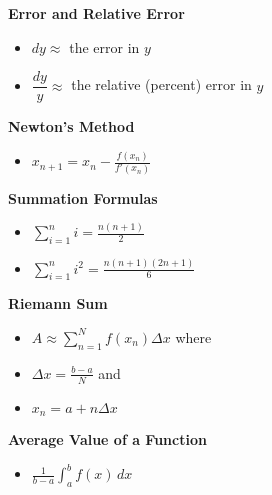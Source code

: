 \documentclass[12pt]{exam}
\newcommand{\ds}{\displaystyle}
\begin{document}
\noindent
\textbf{Error and Relative Error} ~
\begin{itemize}
\item $dy \approx$ the error in $y$
\bigskip
\item $\dfrac{dy}{y} \approx$ the relative (percent) error in $y$
\bigskip
\end{itemize}

\noindent
\textbf{Newton's Method} ~
\begin{itemize}
\item $\ds x_{n+1} = x_n - \frac{f(x_n)}{f'(x_n)}$
\bigskip
\end{itemize}

\noindent
\textbf{Summation Formulas} ~
\begin{itemize}
\item $\ds \sum_{i = 1}^n i = \frac{n(n+1)}{2}$
\item $\ds \sum_{i = 1}^n i^2 = \frac{n(n+1)(2n+1)}{6}$
\bigskip
\end{itemize}

\noindent
\textbf{Riemann Sum} ~
\begin{itemize}
\item $\ds A \approx \sum_{n = 1}^N f(x_n) \Delta x$ where
\item $\ds \Delta x = \frac{b-a}{N}$ and 
\item $\ds x_n = a + n \Delta x$
\bigskip
\end{itemize}

\noindent
\textbf{Average Value of a Function} ~
\begin{itemize}
\item $\ds \frac{1}{b-a}\int_a^b f(x) \, dx$
\bigskip
\end{itemize}
\end{document}
